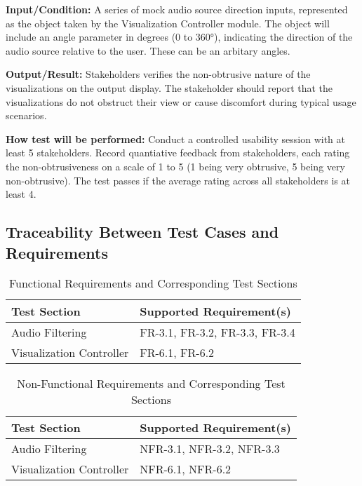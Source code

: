 \documentclass[12pt, titlepage]{article}
\begin{document}
\begin{enumerate}
\textbf{Input/Condition:} 
A series of mock audio source direction inputs, represented as the object taken 
by the Visualization Controller module. The object will include an angle 
parameter in degrees (0 to 360°), indicating the direction of the audio source 
relative to the user. These can be an arbitary angles.
					
\textbf{Output/Result:} 
Stakeholders verifies the non-obtrusive nature of the visualizations 
on the output display. The stakeholder should report that the visualizations do 
not obstruct their view or cause discomfort during typical usage scenarios.

\textbf{How test will be performed:} 
Conduct a controlled usability session with at least 5 stakeholders. Record 
quantiative feedback from stakeholders, each rating the non-obtrusiveness on a 
scale of 1 to 5 (1 being very obtrusive, 5 being very non-obtrusive). The test 
passes if the average rating across all stakeholders is at least 4.

\end{enumerate}

\subsection{Traceability Between Test Cases and Requirements}

\begin{table}[H]
\centering
\caption{Functional Requirements and Corresponding Test Sections}
\begin{tabular}{|l|l|}
\hline
\textbf{Test Section} & \textbf{Supported Requirement(s)} \\ \hline
Audio Filtering & FR-3.1, FR-3.2, FR-3.3, FR-3.4 \\ \hline
Visualization Controller & FR-6.1, FR-6.2 \\ \hline
\end{tabular}
\end{table}

\begin{table}[H]
\centering
\caption{Non-Functional Requirements and Corresponding Test Sections}
\begin{tabular}{|l|l|}
\hline
\textbf{Test Section} & \textbf{Supported Requirement(s)} \\ \hline
Audio Filtering & NFR-3.1, NFR-3.2, NFR-3.3 \\ \hline
Visualization Controller & NFR-6.1, NFR-6.2 \\ \hline
\end{tabular}
\end{table}
\end{document}
